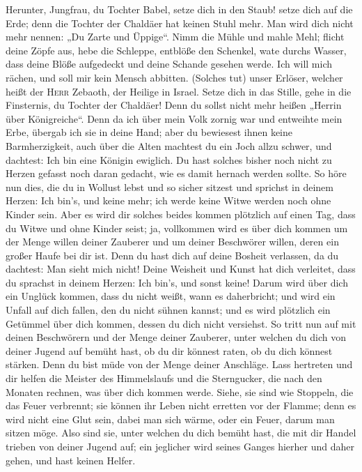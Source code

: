  Herunter, Jungfrau, du Tochter Babel, setze dich in den
Staub! setze dich auf die Erde; denn die Tochter der Chaldäer hat keinen
Stuhl mehr. Man wird dich nicht mehr nennen: „Du Zarte und Üppige``.
 Nimm die Mühle und mahle Mehl; flicht deine Zöpfe aus,
hebe die Schleppe, entblöße den Schenkel, wate durchs Wasser,
 dass deine Blöße aufgedeckt und deine Schande gesehen
werde. Ich will mich rächen, und soll mir kein Mensch abbitten.
 (Solches tut) unser Erlöser, welcher heißt der
\textsc{Herr} Zebaoth, der Heilige in Israel.  Setze dich
in das Stille, gehe in die Finsternis, du Tochter der Chaldäer! Denn du
sollst nicht mehr heißen „Herrin über Königreiche``.  Denn
da ich über mein Volk zornig war und entweihte mein Erbe, übergab ich
sie in deine Hand; aber du bewiesest ihnen keine Barmherzigkeit, auch
über die Alten machtest du ein Joch allzu schwer,  und
dachtest: Ich bin eine Königin ewiglich. Du hast solches bisher noch
nicht zu Herzen gefasst noch daran gedacht, wie es damit hernach werden
sollte.  So höre nun dies, die du in Wollust lebst und so
sicher sitzest und sprichst in deinem Herzen: Ich bin's, und keine mehr;
ich werde keine Witwe werden noch ohne Kinder sein.  Aber
es wird dir solches beides kommen plötzlich auf einen Tag, dass du Witwe
und ohne Kinder seist; ja, vollkommen wird es über dich kommen um der
Menge willen deiner Zauberer und um deiner Beschwörer willen, deren ein
großer Haufe bei dir ist.  Denn du hast dich auf deine
Bosheit verlassen, da du dachtest: Man sieht mich nicht! Deine Weisheit
und Kunst hat dich verleitet, dass du sprachst in deinem Herzen: Ich
bin's, und sonst keine!  Darum wird über dich ein Unglück
kommen, dass du nicht weißt, wann es daherbricht; und wird ein Unfall
auf dich fallen, den du nicht sühnen kannst; und es wird plötzlich ein
Getümmel über dich kommen, dessen du dich nicht versiehst.
 So tritt nun auf mit deinen Beschwörern und der Menge
deiner Zauberer, unter welchen du dich von deiner Jugend auf bemüht
hast, ob du dir könnest raten, ob du dich könnest stärken.
 Denn du bist müde von der Menge deiner Anschläge. Lass
hertreten und dir helfen die Meister des Himmelslaufs und die
Sterngucker, die nach den Monaten rechnen, was über dich kommen werde.
 Siehe, sie sind wie Stoppeln, die das Feuer verbrennt;
sie können ihr Leben nicht erretten vor der Flamme; denn es wird nicht
eine Glut sein, dabei man sich wärme, oder ein Feuer, darum man sitzen
möge.  Also sind sie, unter welchen du dich bemüht hast,
die mit dir Handel trieben von deiner Jugend auf; ein jeglicher wird
seines Ganges hierher und daher gehen, und hast keinen Helfer.

